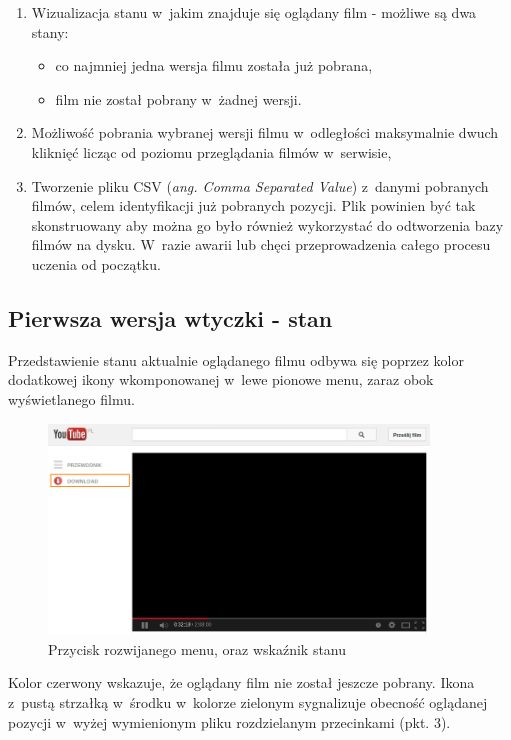 \begin{enumerate}
    \item Wizualizacja stanu w~jakim znajduje się oglądany film - 
        możliwe są dwa stany:
    \begin{itemize}
        \item co najmniej jedna wersja filmu została już pobrana,
        \item film nie został pobrany w~żadnej wersji.
    \end{itemize}
    \item Możliwość pobrania wybranej wersji filmu w~odległości maksymalnie
        dwuch kliknięć licząc od poziomu przeglądania filmów w~serwisie,
    \item Tworzenie pliku CSV (\textit{ang. Comma Separated Value})
        z~danymi pobranych filmów, celem identyfikacji już pobranych
        pozycji. Plik powinien być tak skonstruowany aby można go było
        również wykorzystać do odtworzenia bazy filmów na dysku. W~razie
        awarii lub chęci przeprowadzenia całego procesu uczenia od
        początku.
\end{enumerate}

\subsection{Pierwsza wersja wtyczki - stan}

Przedstawienie stanu aktualnie oglądanego filmu odbywa się poprzez
kolor dodatkowej ikony wkomponowanej w~lewe pionowe menu, zaraz obok
wyświetlanego filmu.

\begin{figure}[h!]
    \caption{Przycisk rozwijanego menu, oraz wskaźnik stanu}
    \centering
    \includegraphics[width=0.9\textwidth]{img/env_yt_dwn_indicator}
\end{figure}

Kolor czerwony wskazuje, że oglądany film nie został jeszcze pobrany.
Ikona z~pustą strzałką w~środku w~kolorze zielonym sygnalizuje obecność
oglądanej pozycji w~wyżej wymienionym pliku rozdzielanym przecinkami
(pkt. 3).

